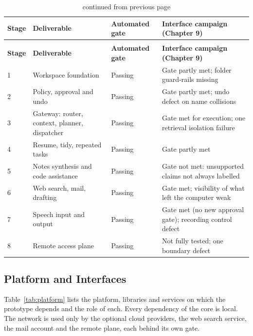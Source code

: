 \documentclass{FastFyp}
\begin{document}
{
\begin{longtable}{|p{0.9cm}|p{4.6cm}|p{3.4cm}|p{4.5cm}|}
\caption{Implementation status by stage.}\label{tab:status}\\*
\hline
\textbf{Stage} & \textbf{Deliverable} & \textbf{Automated gate} & \textbf{Interface campaign (Chapter 9)} \\*
\hline
\endfirsthead
\caption[]{continued from previous page}\\*
\hline
\textbf{Stage} & \textbf{Deliverable} & \textbf{Automated gate} & \textbf{Interface campaign (Chapter 9)} \\*
\hline
\endhead
\hline
1 & Workspace foundation & Passing & Gate partly met; folder guard-rails missing \\*
\hline
2 & Policy, approval and undo & Passing & Gate partly met; undo defect on name collisions \\*
\hline
3 & Gateway: router, context, planner, dispatcher & Passing & Gate met for execution; one retrieval isolation failure \\
\hline
4 & Resume, tidy, repeated tasks & Passing & Gate partly met \\
\hline
5 & Notes synthesis and code assistance & Passing & Gate not met: unsupported claims not always labelled \\
\hline
6 & Web search, mail, drafting & Passing & Gate met; visibility of what left the computer weak \\
\hline
7 & Speech input and output & Passing & Gate met (no new approval gate); recording control defect \\
\hline
8 & Remote access plane & Passing & Not fully tested; one boundary defect \\
\hline
\end{longtable}
}

\subsection{Platform and Interfaces}
Table~\ref{tab:platform} lists the platform, libraries and services on which the prototype depends and the role of each. Every dependency of the core is local. The network is used only by the optional cloud providers, the web search service, the mail account and the remote plane, each behind its own gate.
\end{document}
